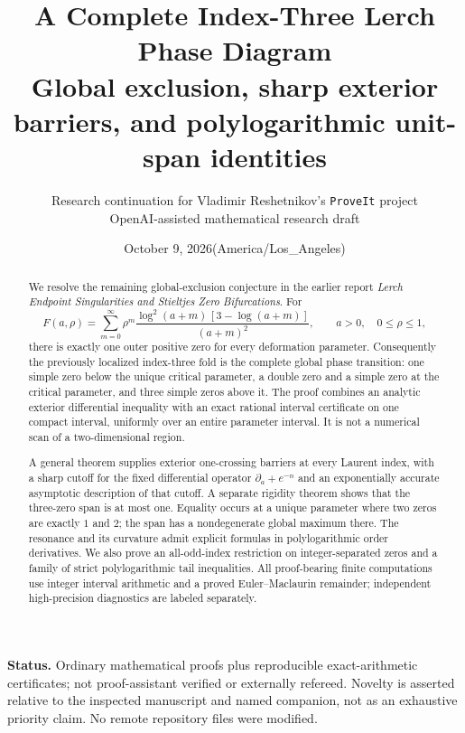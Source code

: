 \documentclass[11pt]{article}
\title{A Complete Index-Three Lerch Phase Diagram\\[5pt]
\large Global exclusion, sharp exterior barriers, and polylogarithmic unit-span identities}
\author{Research continuation for Vladimir Reshetnikov's \texttt{ProveIt} project\\
\small OpenAI-assisted mathematical research draft}
\date{October 9, 2026\quad (America/Los\_Angeles)}
\numberwithin{equation}{section}
\theoremstyle{definition}
\begin{document}
\maketitle
\thispagestyle{empty}
\begin{abstract}
We resolve the remaining global-exclusion conjecture in the earlier report
\emph{Lerch Endpoint Singularities and Stieltjes Zero Bifurcations}.
For
\[
 F(a,\rho)=\sum_{m=0}^{\infty}\rho^m
 \frac{\log^2(a+m)\,[3-\log(a+m)]}{(a+m)^2},
 \qquad a>0,\quad 0\leq\rho\leq1,
\]
there is exactly one outer positive zero for every deformation parameter.
Consequently the previously localized index-three fold is the complete global
phase transition: one simple zero below the unique critical parameter, a double
zero and a simple zero at the critical parameter, and three simple zeros above it.
The proof combines an analytic exterior differential inequality with an exact
rational interval certificate on one compact interval, uniformly over an entire
parameter interval. It is not a numerical scan of a two-dimensional region.

A general theorem supplies exterior one-crossing barriers at every Laurent
index, with a sharp cutoff for the fixed differential operator
$\partial_a+e^{-n}$ and an exponentially accurate asymptotic description of that
cutoff. A separate rigidity theorem shows that the three-zero span is at most
one. Equality occurs at a unique parameter where two zeros are exactly $1$ and
$2$; the span has a nondegenerate global maximum there. The resonance and its
curvature admit explicit formulas in polylogarithmic order derivatives.
We also prove an all-odd-index restriction on integer-separated zeros and a
family of strict polylogarithmic tail inequalities. All proof-bearing finite
computations use integer interval arithmetic and a proved Euler--Maclaurin
remainder; independent high-precision diagnostics are labeled separately.
\end{abstract}
\medskip
\noindent\textbf{Status.} Ordinary mathematical proofs plus reproducible exact-arithmetic
certificates; not proof-assistant verified or externally refereed. Novelty is
asserted relative to the inspected manuscript and named companion, not as an
exhaustive priority claim. No remote repository files were modified.
\newpage
\tableofcontents
\newpage
\end{document}
